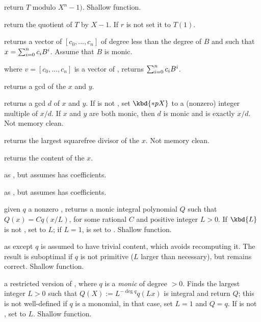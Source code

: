  return $T$ modulo $X^n - 1)$. Shallow
function.

 return the quotient of $T$ by $X-1$.
If $r$ is not  set it to $T(1)$.

 returns a vector of 
$[c_0,\ldots,c_n]$ of degree less than the degree of $B$ and such that
$x=\sum_{i=0}^{n}{c_i\*B^i}$. Assume that $B$ is monic.

 where $v=[c_0,\ldots,c_n]$
is a vector of , returns $\sum_{i=0}^{n}{c_i\*B^i}$.

 returns a gcd of the  $x$ and $y$.

 returns a gcd $d$ of $x$ and
$y$. If  is not , set $\kbd{*pX}$ to a (nonzero) integer
multiple of $x/d$. If $x$ and $y$ are both monic, then $d$ is monic and
 is exactly $x/d$. Not memory clean.

 returns the largest squarefree divisor
of the  $x$. Not memory clean.

 returns the content of the  $x$.

 as , but assumes  has 
coefficients.

 as , but assumes
 has  coefficients.

 given $q$ a nonzero ,
returns a monic integral polynomial $Q$ such that $Q(x) = C q(x/L)$, for some
rational $C$ and positive integer $L > 0$. If $\kbd{L}$ is not ,
set  to $L$; if $L = 1$,  is set to . Shallow
function.

 as  except
$q$ is assumed to have trivial content, which avoids recomputing it.
The result is suboptimal if $q$ is not primitive ($L$ larger than
necessary), but remains correct. Shallow function.

 a restricted version of
, where $q$ is a \emph{monic} 
of degree $> 0$. Finds the largest integer $L > 0$ such that
$Q(X) := L^{-\deg q} q(Lx)$ is integral and return $Q$; this is not
well-defined if $q$ is a monomial, in that case, set $L=1$ and $Q = q$. If
 is not , set  to $L$. Shallow function.

